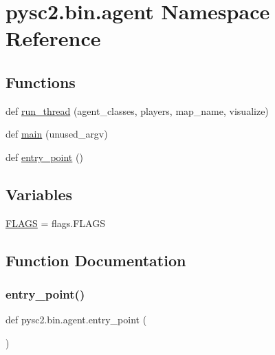 \hypertarget{namespacepysc2_1_1bin_1_1agent}{}\section{pysc2.\+bin.\+agent Namespace Reference}
\label{namespacepysc2_1_1bin_1_1agent}
\subsection*{Functions}
\begin{DoxyCompactItemize}
\item 
def \mbox{\hyperlink{namespacepysc2_1_1bin_1_1agent_a50f03896b5536897af2b2808e8132f91}{run\+\_\+thread}} (agent\+\_\+classes, players, map\+\_\+name, visualize)
\item 
def \mbox{\hyperlink{namespacepysc2_1_1bin_1_1agent_a45a775fd3c91bc9ac9f516133e0bf839}{main}} (unused\+\_\+argv)
\item 
def \mbox{\hyperlink{namespacepysc2_1_1bin_1_1agent_a636f4baf199104de55d8a02693c4c575}{entry\+\_\+point}} ()
\end{DoxyCompactItemize}
\subsection*{Variables}
\begin{DoxyCompactItemize}
\item 
\mbox{\hyperlink{namespacepysc2_1_1bin_1_1agent_a2697325d7b7d8ce788e96d6b61315d27}{F\+L\+A\+GS}} = flags.\+F\+L\+A\+GS
\end{DoxyCompactItemize}


\subsection{Function Documentation}
\mbox{\label{namespacepysc2_1_1bin_1_1agent_a636f4baf199104de55d8a02693c4c575}} 
\subsubsection{\texorpdfstring{entry\+\_\+point()}{entry\_point()}}
{\footnotesize\ttfamily def pysc2.\+bin.\+agent.\+entry\+\_\+point (\begin{DoxyParamCaption}{ }\end{DoxyParamCaption})}

